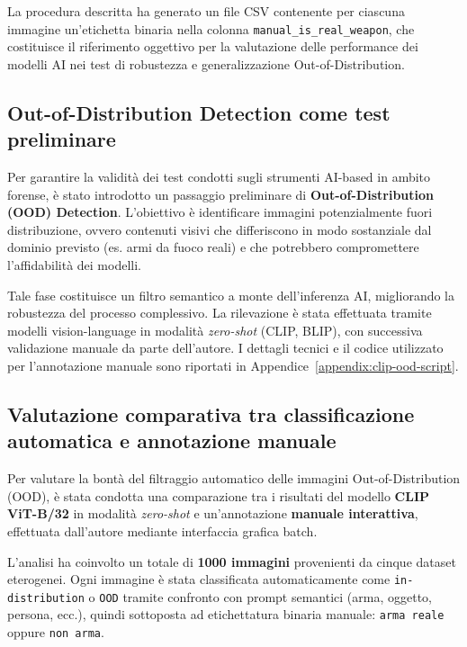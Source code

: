 \bigskip

La procedura descritta ha generato un file CSV contenente per ciascuna immagine un’etichetta binaria nella colonna \texttt{manual\_is\_real\_weapon}, che costituisce il riferimento oggettivo per la valutazione delle performance dei modelli AI nei test di robustezza e generalizzazione Out-of-Distribution.





\subsection{Out-of-Distribution Detection come test preliminare}
\label{sec:ood-pre-test}

Per garantire la validità dei test condotti sugli strumenti AI-based in ambito forense, è stato introdotto un passaggio preliminare di \textbf{Out-of-Distribution (OOD) Detection}. L'obiettivo è identificare immagini potenzialmente fuori distribuzione, ovvero contenuti visivi che differiscono in modo sostanziale dal dominio previsto (es. armi da fuoco reali) e che potrebbero compromettere l'affidabilità dei modelli.

Tale fase costituisce un filtro semantico a monte dell'inferenza AI, migliorando la robustezza del processo complessivo. La rilevazione è stata effettuata tramite modelli vision-language in modalità \textit{zero-shot} (CLIP, BLIP), con successiva validazione manuale da parte dell'autore. I dettagli tecnici e il codice utilizzato per l'annotazione manuale sono riportati in Appendice~\ref{appendix:clip-ood-script}.






\subsection{Valutazione comparativa tra classificazione automatica e annotazione manuale}
\label{sec:valutazione-ood}

Per valutare la bontà del filtraggio automatico delle immagini Out-of-Distribution (OOD), è stata condotta una comparazione tra i risultati del modello \textbf{CLIP ViT-B/32} in modalità \textit{zero-shot} e un'annotazione \textbf{manuale interattiva}, effettuata dall'autore mediante interfaccia grafica batch.

L'analisi ha coinvolto un totale di \textbf{1000 immagini} provenienti da cinque dataset eterogenei. Ogni immagine è stata classificata automaticamente come \texttt{in-distribution} o \texttt{OOD} tramite confronto con prompt semantici (arma, oggetto, persona, ecc.), quindi sottoposta ad etichettatura binaria manuale: \texttt{arma reale} oppure \texttt{non arma}.


